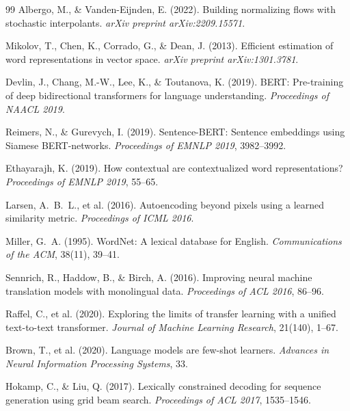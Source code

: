 \documentclass[12pt, a4paper]{article}
\theoremstyle{plain}
\theoremstyle{definition}
\theoremstyle{remark}
\begin{document}
\begin{thebibliography}{99}
Albergo, M., \& Vanden-Eijnden, E. (2022).
\newblock Building normalizing flows with stochastic interpolants.
\newblock \emph{arXiv preprint arXiv:2209.15571}.


Mikolov, T., Chen, K., Corrado, G., \& Dean, J. (2013).
\newblock Efficient estimation of word representations in vector space.
\newblock \emph{arXiv preprint arXiv:1301.3781}.

Devlin, J., Chang, M.-W., Lee, K., \& Toutanova, K. (2019).
\newblock BERT: Pre-training of deep bidirectional transformers for language
  understanding.
\newblock \emph{Proceedings of NAACL 2019}.

Reimers, N., \& Gurevych, I. (2019).
\newblock Sentence-BERT: Sentence embeddings using Siamese BERT-networks.
\newblock \emph{Proceedings of EMNLP 2019}, 3982--3992.

Ethayarajh, K. (2019).
\newblock How contextual are contextualized word representations?
\newblock \emph{Proceedings of EMNLP 2019}, 55--65.

Larsen, A.~B.~L., et al. (2016).
\newblock Autoencoding beyond pixels using a learned similarity metric.
\newblock \emph{Proceedings of ICML 2016}.


Miller, G.~A. (1995).
\newblock WordNet: A lexical database for English.
\newblock \emph{Communications of the ACM}, 38(11), 39--41.

Sennrich, R., Haddow, B., \& Birch, A. (2016).
\newblock Improving neural machine translation models with monolingual data.
\newblock \emph{Proceedings of ACL 2016}, 86--96.

Raffel, C., et al. (2020).
\newblock Exploring the limits of transfer learning with a unified
  text-to-text transformer.
\newblock \emph{Journal of Machine Learning Research}, 21(140), 1--67.

Brown, T., et al. (2020).
\newblock Language models are few-shot learners.
\newblock \emph{Advances in Neural Information Processing Systems}, 33.

Hokamp, C., \& Liu, Q. (2017).
\newblock Lexically constrained decoding for sequence generation using grid
  beam search.
\newblock \emph{Proceedings of ACL 2017}, 1535--1546.


\end{thebibliography}
\end{document}

